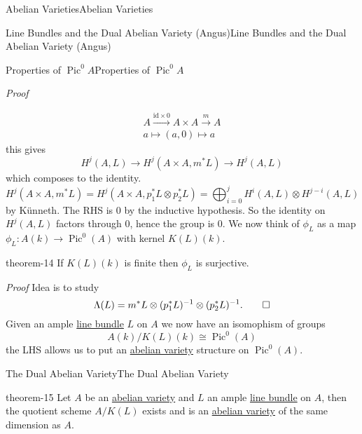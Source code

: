 \documentclass[10pt,]{book}
\makeatletter
\renewcommand*{\proofname}{Proof}
\renewenvironment{proof}[1][\proofname]{\par
  \pushQED{\qed}%
  \normalfont \topsep6\p@\@plus6\p@\relax
  \trivlist
  \item\relax
    {\itshape
    #1\@addpunct{.}}\hspace\labelsep\ignorespaces
}{%
  \popQED\endtrivlist\@endpefalse
}
\numberwithin{equation}{section}
\newcommand{\id}{\mathrm{id}}
\DeclareMathOperator{\Pic}{Pic}
\makeatother
\begin{document}
\begin{chapterptx}{Abelian Varieties}{}{Abelian Varieties}{}{}
\begin{sectionptx}{Line Bundles and the Dual Abelian Variety (Angus)}{}{Line Bundles and the Dual Abelian Variety (Angus)}{}{}
\begin{subsectionptx}{Properties of \(\Pic^0 A\)}{}{Properties of \(\Pic^0 A\)}{}{}
\begin{proof}
\begin{gather*}
A\xrightarrow{\id \times 0} A\times A \xrightarrow m A\\
a\mapsto (a,0)\mapsto a
\end{gather*}
this gives%
\begin{equation*}
H^j(A, L) \to H^j(A\times A, m^*L) \to H^j(A,L)
\end{equation*}
which composes to the identity.%
\begin{equation*}
H^j(A\times A, m^*L) =  H^j(A\times A, p_1^*L \otimes p_2^*L) = \bigoplus_{i=0}^j H^i(A,L) \otimes H^{j-i}(A,L)
\end{equation*}
by Künneth. The RHS is 0 by the inductive hypothesis. So the identity on \(H^j(A,L)\) factors through 0, hence the group is 0.%
\end{proof}
\hypertarget{p-186}{}%
We now think of \(\phi_L\) as a map \(\phi_L \colon A(k) \to \Pic^0(A)\) with kernel \(K(L) (k)\).%
\begin{theorem}{}{}{theorem-14}%
\hypertarget{p-187}{}%
If \(K(L)(k)\) is finite then \(\phi_L\) is surjective.%
\end{theorem}
\begin{proof}\hypertarget{proof-36}{}
\hypertarget{p-188}{}%
Idea is to study%
\begin{equation*}
\Lambda (L) =  m^* L \otimes (p_1^* L)^{-1} \otimes (p_2^* L)^{-1}\text{.}\qedhere
\end{equation*}
%
\end{proof}
\hypertarget{p-189}{}%
Given an ample \hyperref[def-line-bundle]{line bundle} \(L\) on \(A\) we now have an isomophism of groups%
\begin{equation*}
A(k)/K(L)(k) \cong \Pic^0(A)
\end{equation*}
the LHS allows us to put an \hyperref[def-buntes-abvar]{abelian variety} structure on \(\Pic^0(A)\).%
\end{subsectionptx}
%
%
\typeout{************************************************}
\typeout{************************************************}
%
\begin{subsectionptx}{The Dual Abelian Variety}{}{The Dual Abelian Variety}{}{}\label{subsection-23}
\begin{theorem}{}{}{theorem-15}%
\hypertarget{p-190}{}%
Let \(A\) be an \hyperref[def-buntes-abvar]{abelian variety} and \(L\) an ample \hyperref[def-line-bundle]{line bundle} on \(A\), then the quotient scheme \(A/K(L)\) exists and is an \hyperref[def-buntes-abvar]{abelian variety} of the same dimension as \(A\).%

\end{theorem}
\end{subsectionptx}
\end{sectionptx}
\end{chapterptx}
\end{document}
